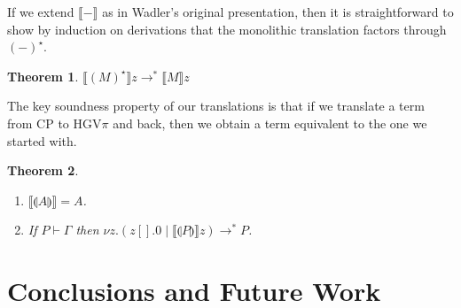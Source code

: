 \documentclass{easychair}
\makeatletter
\newtheorem{theorem}{Theorem}
\newcommand{\ba}{\begin{array}}
\newcommand{\ea}{\end{array}}
\newenvironment{equations}{\[\ba{@{}r@{~}c@{~}l@{}}}{\ea\]}
\newcommand{\cptogv}[1]{\llparenthesis{#1}\rrparenthesis}
\newcommand{\cpj}[2]{{#1} \vdash {#2}}
\newcommand{\gvj}[3]{{#1} \vdash {#2} : {#3}}
\newcommand{\G}{\Gamma}
\newcommand{\cpCut}[3]{\nu {#1}.({#2} \mid {#3})}
\newcommand{\cpEmptyOut}[1]{{#1}[].0}
\newcommand{\cpDual}[1]{{#1}^\bot}
\newcommand{\hgv}{HGV\xspace}
\newcommand{\hgvpi}{HGV$\pi$\xspace}
\newcommand{\lampi}[1]{({#1})^\star}
\newcommand{\hgvcp}[1]{\llbracket{#1}\rrbracket}
\makeatother
\begin{document}
If we extend $\hgvcp{-}$ as in Wadler's original presentation, then it
is straightforward to show by induction on derivations that the
monolithic translation factors through $\lampi{-}$.
\begin{theorem}
$\hgvcp{\lampi{M}}z \longrightarrow^* \hgvcp{M}z$
\end{theorem}


The key soundness property of our translations is that if we translate
a term from CP to \hgvpi and back, then we obtain a term equivalent to
the one we started with.
\begin{theorem}
~
\begin{enumerate}
\item $\hgvcp{\cptogv{A}} = A$.
\item If $\cpj{P}{\G}$ then $\cpCut{z}{\cpEmptyOut{z}}{\hgvcp{\cptogv{P}}z} \longrightarrow^* P$.
\end{enumerate}
\end{theorem}







\section{Conclusions and Future Work}
\end{document}
